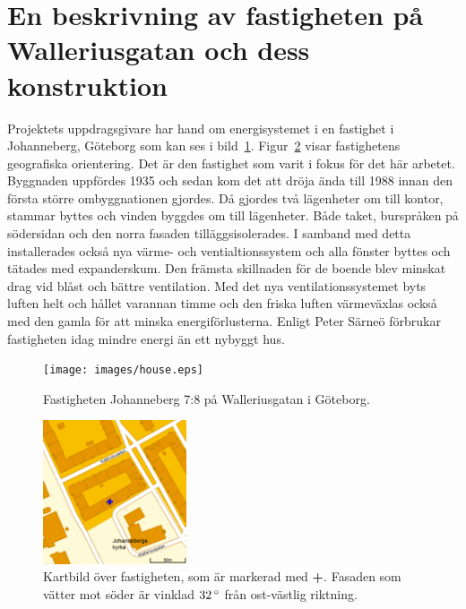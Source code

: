 \section{En beskrivning av fastigheten på Walleriusgatan och dess konstruktion}
\label{subsec:thehouse}




Projektets uppdragsgivare har hand om energisystemet i en fastighet i Johanneberg,
Göteborg som kan ses i bild~\ref{fig:thehouse:house}. Figur~\ref{fig:thehouse:map}
visar fastighetens geografiska orientering.
Det är den fastighet som varit i fokus för det här arbetet. Byggnaden uppfördes 1935\cite{ritningar_urspr}
och sedan kom det att dröja ända till 1988 innan den första större ombyggnationen gjordes.
Då gjordes två lägenheter om till kontor, stammar byttes och vinden byggdes om till lägenheter.
Både taket, burspråken på södersidan och den norra fasaden tilläggsisolerades.
I samband med detta installerades också nya värme- och ventialtionssystem och alla
fönster byttes och tätades med expanderskum. Den främsta skillnaden för de boende
blev minskat drag vid blåst och bättre ventilation.  Med det nya ventilationssystemet
byts luften helt och hållet varannan timme och den friska luften värmeväxlas också med den gamla för att minska energiförlusterna. Enligt Peter Särneö\cite{petersarneo}
förbrukar fastigheten idag mindre energi än ett nybyggt hus.

\begin{figure}
\centering
\texttt{[image: images/house.eps]}
\caption{Fastigheten Johanneberg 7:8 på Walleriusgatan i Göteborg.}
\label{fig:thehouse:house}
\end{figure}

\begin{figure}
\centering
\includegraphics[width=1.67in,height=1.67in]{images/map.eps}
\caption{Kartbild över fastigheten, som är markerad med \textbf{\color{blue}+}. Fasaden som vätter mot söder är vinklad $\unit[32]{^\circ}$ från
ost-västlig riktning.}
\label{fig:thehouse:map}
\end{figure}


